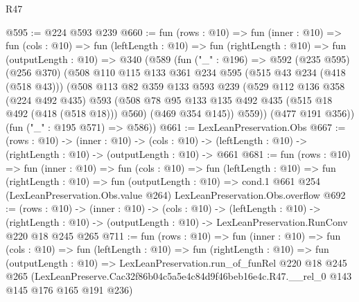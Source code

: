 \begin{lexlean}{R47}
\begin{coremodule}
@595 := @224 @593 @239
@660 := fun (rows : @10) =>
  fun (inner : @10) =>
  fun (cols : @10) =>
  fun (leftLength : @10) =>
  fun (rightLength : @10) =>
  fun (outputLength : @10) =>
  @340
    (@589
      (fun ("_" : @196) =>
      @592
        (@235 @595)
        (@256 @370)
        (@508
          @110
          @115
          @133
          @361
          @234
          @595
          (@515 @43 @234 (@418 (@518 @43)))
          (@508
            @113
            @82
            @359
            @133
            @593
            @239
            (@529
              @112
              @136
              @358
              (@224 @492 @435)
              @593
              (@508 @78 @95 @133 @135 @492 @435 (@515 @18 @492 (@418 (@518 @18))) @560)
              (@469 @354 @145))
            @559))
        (@477 @191 @356))
      (fun ("_" : @195 @571) => @586))
@661 := LexLeanPreservation.Obs
@667 := (rows : @10) ->
  (inner : @10) ->
  (cols : @10) -> (leftLength : @10) -> (rightLength : @10) -> (outputLength : @10) -> @661
@681 := fun (rows : @10) =>
  fun (inner : @10) =>
  fun (cols : @10) =>
  fun (leftLength : @10) =>
  fun (rightLength : @10) =>
  fun (outputLength : @10) =>
  cond.{1} @661 @254 (LexLeanPreservation.Obs.value @264) LexLeanPreservation.Obs.overflow
@692 := (rows : @10) ->
  (inner : @10) ->
  (cols : @10) ->
  (leftLength : @10) ->
  (rightLength : @10) -> (outputLength : @10) -> LexLeanPreservation.RunConv @220 @18 @245 @265
@711 := fun (rows : @10) =>
  fun (inner : @10) =>
  fun (cols : @10) =>
  fun (leftLength : @10) =>
  fun (rightLength : @10) =>
  fun (outputLength : @10) =>
  LexLeanPreservation.run_of_funRel
    @220
    @18
    @245
    @265
    (LexLeanPreserve.Cac32f86b04c5a5e4c84d9f46beb16e4c.R47.__rel_0 @143 @145 @176 @165 @191 @236)
\end{coremodule}
\end{lexlean}
